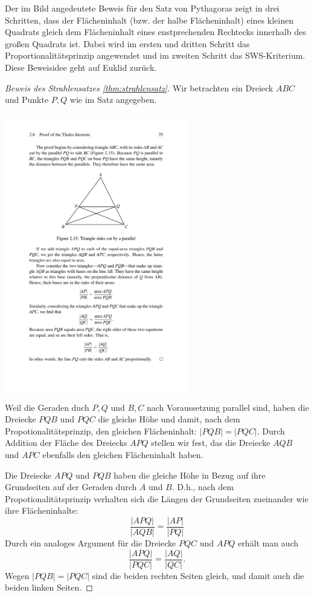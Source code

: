 Der im Bild angedeutete Beweis für den Satz von Pythagoras zeigt in drei Schritten, dass der
Flächeninhalt (bzw. der halbe Flächeninhalt) eines kleinen Quadrats gleich dem Flächeninhalt eines
enstprechenden Rechtecks innerhalb des großen Quadrats ist. Dabei wird im ersten und dritten Schritt
das Proportionalitätsprinzip angewendet und im zweiten Schritt das SWS-Kriterium. Diese Beweisidee
geht auf Euklid zurück.

\begin{proof}[Beweis des Strahlensatzes \ref{thm:strahlensatz}]
    Wir betrachten ein Dreieck $ABC$ und Punkte $P,Q$ wie im Satz angegeben. %

    \begin{center}
        \includegraphics[width=8cm]{BILDER/BildBeweisStrahlensatz.pdf}
    \end{center}

    Weil die Geraden duch $P,Q$ und $B,C$ nach Voraussetzung parallel sind, haben die Dreiecke $PQB$
    und $PQC$ die gleiche Höhe und damit, nach dem Propotionalitätsprinzip, den gleichen
    Flächeninhalt: $|PQB|=|PQC|$. Durch Addition der Fläche des Dreiecks $APQ$ stellen wir fest, das
    die Dreiecke $AQB$ und $APC$ ebenfalls den gleichen Flächeninhalt haben.

    Die Dreiecke $APQ$ und $PQB$ haben die gleiche Höhe in Bezug auf ihre Grundseiten auf der
    Geraden durch $A$ und $B$. D.h., nach dem Propotionalitätsprinzip verhalten sich die Längen der
    Grundseiten zueinander wie ihre Flächeninhalte:
    $$
    \frac{|APQ|}{|AQB|} = \frac{|AP|}{|PQ|}
    $$
    Durch ein analoges Argument für die Dreiecke $PQC$ und $APQ$ erhält man auch
    $$
    \frac{|APQ|}{|PQC|} = \frac{|AQ|}{|QC|}.
    $$
    Wegen $|PQB|=|PQC|$ sind die beiden rechten Seiten gleich, und damit auch die beiden linken
    Seiten.
\end{proof}

